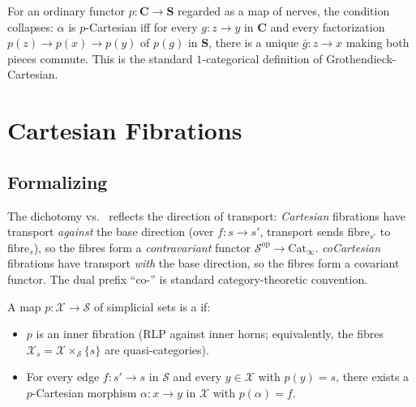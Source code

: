 \begin{remark}
For an ordinary functor $p : \mathbf{C} \to \mathbf{S}$ regarded as a map
of nerves, the condition collapses: $\alpha$ is $p$-Cartesian iff for
every $g : z \to y$ in $\mathbf{C}$ and every factorization $p(z) \to p(x)
\to p(y)$ of $p(g)$ in $\mathbf{S}$, there is a unique $\bar g : z \to x$
making both pieces commute. This is the standard $1$-categorical
definition of Grothendieck-Cartesian.
\end{remark}


\section{Cartesian Fibrations}
\label{sec:cartesian-fibrations}

\subsection{Formalizing}

\begin{nameorigin}
The dichotomy  vs.\  reflects the
direction of transport: \emph{Cartesian} fibrations have transport
\emph{against} the base direction (over $f : s \to s'$, transport sends
fibre$_{s'}$ to fibre$_{s}$), so the fibres form a \emph{contravariant}
functor $\mathcal{S}^{\mathrm{op}} \to \mathrm{Cat}_\infty$.
\emph{coCartesian} fibrations have transport \emph{with} the base
direction, so the fibres form a covariant functor. The dual prefix
``co-'' is standard category-theoretic convention.
\end{nameorigin}

\begin{definition}
\label{def:cartesian-fibration}
A map $p : \mathcal{X} \to \mathcal{S}$ of simplicial sets is a
 if:
\begin{itemize}
  \item $p$ is an inner fibration (RLP against inner horns; equivalently,
        the fibres $\mathcal{X}_s = \mathcal{X} \times_\mathcal{S} \{s\}$ are
        quasi-categories).
  \item For every edge $f : s' \to s$ in $\mathcal{S}$ and every $y \in
        \mathcal{X}$ with $p(y) = s$, there exists a $p$-Cartesian
        morphism $\alpha : x \to y$ in $\mathcal{X}$ with $p(\alpha) = f$.
\end{itemize}
\end{definition}

